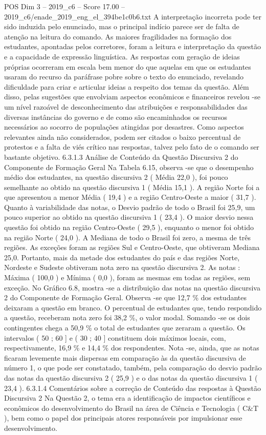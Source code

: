 \begin{textsample}{POS Dim 3 – 2019\_c6 – Score 17.00 – 2019\_c6/enade\_2019\_eng\_el\_394be1c0b6.txt}
A interpretação incorreta pode ter sido induzida pelo enunciado, mas o principal indício parece ser de falta de atenção na leitura do comando.
As maiores fragilidades na formação dos estudantes, apontadas pelos corretores, foram a leitura e interpretação da questão e a capacidade de expressão linguística.
As respostas com geração de ideias próprias ocorreram em escala bem menor do que aquelas em que os estudantes usaram do recurso da paráfrase pobre sobre o texto do enunciado, revelando dificuldade para criar e articular ideias a respeito dos temas da questão.
Além disso, pelas sugestões que envolviam aspectos econômicos e financeiros revelou -se um nível razoável de desconhecimento das atribuições e responsabilidades das diversas instâncias do governo e de como são encaminhados os recursos necessários ao socorro de populações atingidas por desastres.
Como aspectos relevantes ainda não considerados, podem ser citados o baixo percentual de protestos e a falta de viés crítico nas respostas, talvez pelo fato de o comando ser bastante objetivo. 6.3.1.3 Análise de Conteúdo da Questão Discursiva 2 do Componente de Formação Geral Na Tabela 6.15, observa -se que o desempenho médio dos estudantes, na questão discursiva 2 ( Média 22,0 ), foi pouco semelhante ao obtido na questão discursiva 1 ( Média 15,1 ).
A região Norte foi a que apresentou a menor Média ( 19,4 ) e a região Centro-Oeste a maior ( 31,7 ).
Quanto à variabilidade das notas, o Desvio padrão de todo o Brasil foi 25,9, um pouco superior ao obtido na questão discursiva 1 ( 23,4 ).
O maior desvio nessa questão foi obtido na região Centro-Oeste ( 29,5 ), enquanto o menor foi obtido na região Norte ( 24,0 ).
A Mediana de todo o Brasil foi zero, a mesma de três regiões.
As exceções foram as regiões Sul e Centro-Oeste, que obtiveram Mediana 25,0.
Portanto, mais da metade dos estudantes do país e das regiões Norte, Nordeste e Sudeste obtiveram nota zero na questão discursiva 2.
As notas : Máxima ( 100,0 ) e Mínima ( 0,0 ), foram as mesmas em todas as regiões, sem exceção.
No Gráfico 6.8, mostra -se a distribuição das notas na questão discursiva 2 do Componente de Formação Geral.
Observa -se que 12,7 \% dos estudantes deixaram a questão em branco.
O percentual de estudantes que, tendo respondido a questão, receberam nota zero foi 38,2 \%, o valor modal.
Somando -se os dois contingentes chega a 50,9 \% o total de estudantes que zeraram a questão.
Os intervalos ( 50 ; 60 ] e ( 30 ; 40 ] constituem dois máximos locais, com, respectivamente, 16,9 \% e 14,4 \% dos respondentes.
Nota -se, ainda, que as notas ficaram levemente mais dispersas em comparação às da questão discursiva de número 1, o que pode ser constatado, também, pela comparação do desvio padrão das notas da questão discursiva 2 ( 25,9 ) e o das notas da questão discursiva 1 ( 23,4 ). 6.3.1.4 Comentários sobre a correção de Conteúdo das respostas à Questão Discursiva 2 Na Questão 2, o tema era a identificação de impactos científicos e econômicos do desenvolvimento do Brasil na área de Ciência e Tecnologia ( C\&T ), bem como o papel dos principais atores responsáveis por impulsionar esse desenvolvimento.

\end{textsample}
